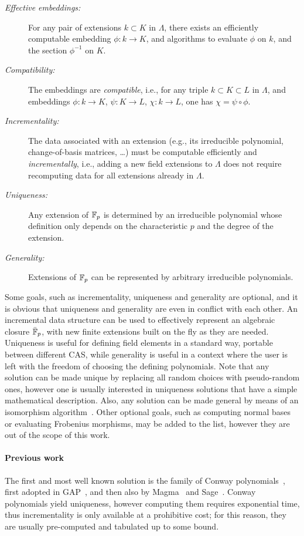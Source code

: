 \documentclass{sig-alternate}
\begin{document}
\begin{description}
\item[\emph{Effective embeddings:}] For any pair of extensions
  $k\subset K$ in $\Lambda$, there exists an efficiently computable
  embedding $\phi:k\to K$, and algorithms to evaluate $\phi$ on $k$,
  and the section $\phi^{-1}$ on $K$.
\item[\emph{Compatibility:}] The embeddings are \emph{compatible},
  i.e., for any triple $k\subset K\subset L$ in $\Lambda$, and
  embeddings $\phi:k\to K$, $\psi:K\to L$, $\chi:k\to L$, one has
  $\chi=\psi\circ\phi$.
\item[\emph{Incrementality:}] The data associated with an extension
  (e.g., its irreducible polynomial, change-of-basis matrices, \dots)
  must be computable efficiently and \emph{incrementally}, i.e.,
  adding a new field extensions to $\Lambda$ does not require
  recomputing data for all extensions already in $\Lambda$. %
\item[\emph{Uniqueness:}] Any extension of $\mathbb{F}_p$ is determined by an
  irreducible polynomial whose definition only depends on the
  characteristic $p$ and the degree of the extension. %
\item[\emph{Generality:}] Extensions of $\mathbb{F}_p$ can be represented by
  arbitrary irreducible polynomials.
\end{description}

Some goals, such as incrementality, uniqueness and generality are
optional, and it is obvious that uniqueness and generality are even in
conflict with each other. %
An incremental data structure can be used to effectively represent an
algebraic closure $\bar{\mathbb{F}}_p$, with new finite extensions built on the
fly as they are needed. %
Uniqueness is useful for defining field elements in a standard way,
portable between different CAS, while generality is useful in a
context where the user is left with the freedom of choosing the
defining polynomials. %
Note that any solution can be made unique by replacing all random
choices with pseudo-random ones, however one is usually interested in
uniqueness solutions that have a simple mathematical description. %
Also, any solution can be made general by means of an isomorphism
algorithm~\cite{LenstraJr91,Allombert02,rains2008,brieulle2018computing,narayanan2016fast}. %
Other optional goals, such as computing normal bases or evaluating
Frobenius morphisms, may be added to the list, however they are out of
the scope of this work.

\paragraph{Previous work}
The first and most well known solution is the family of Conway
polynomials~\cite{Nickel1988,heath+loehr99}, first adopted in
GAP~\cite{GAP4}, and then also by Magma~\cite{MAGMA} and
Sage~\cite{Sage}. %
Conway polynomials yield uniqueness, however computing them requires
exponential time, thus incrementality is only available at a
prohibitive cost; for this reason, they are usually pre-computed and
tabulated up to some bound.
\end{document}
